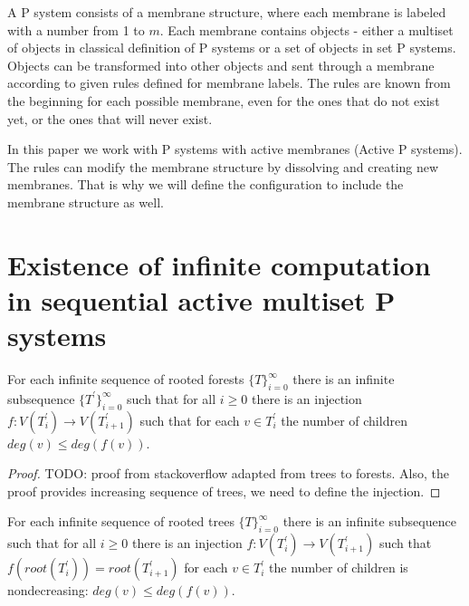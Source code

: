 \documentclass[llncs,submission,copyright,creativecommons]{../lib/lncs/llncs}
\begin{document}
A P system consists of a membrane structure, where each membrane is labeled with a number from 1 to $m$. Each membrane contains objects - either a multiset of objects in classical definition of P systems or a set of objects in set P systems. Objects can be transformed into other objects and sent through a membrane according to given rules defined for membrane labels. The rules are known from the beginning for each possible membrane, even for the ones that do not exist yet, or the ones that will never exist.

In this paper we work with P systems with active membranes (Active P systems). The rules can modify the membrane structure by dissolving and creating new membranes. That is why we will define the configuration to include the membrane structure as well.




\section{Existence of infinite computation in sequential active multiset P systems} %
\label{sec:existence_of_infinite_computation_in_sequential_active_multiset_p_systems}

\begin{lemma}
  For each infinite sequence of rooted forests $\{T\}_{i=0}^\infty$ there is an infinite subsequence $\{T^\prime\}_{i=0}^\infty$ such that for all $i\geq 0$ there is an injection $f: V(T_i^\prime) \rightarrow V(T_{i+1}^\prime)$ such that for each $v\in T_i^\prime$ the number of children $deg(v)\leq deg(f(v))$.
\end{lemma}

\begin{proof}
  TODO: proof from stackoverflow adapted from trees to forests. Also, the proof provides increasing sequence of trees, we need to define the injection.
\end{proof}

\begin{lemma}
  For each infinite sequence of rooted trees $\{T\}_{i=0}^\infty$ there is an infinite subsequence such that for all $i\geq 0$ there is an injection $f: V(T_i^\prime) \rightarrow V(T_{i+1}^\prime)$ such that $f(root(T_i^\prime)) = root(T_{i+1}^\prime)$ for each $v\in T_i^\prime$ the number of children is nondecreasing: $deg(v)\leq deg(f(v))$.
\end{lemma}
\end{document}
